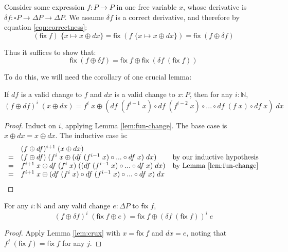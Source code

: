 \documentclass[a5,libertine]{rntz}
\newcommand{\ms}[1]{\ensuremath{\mathsf{#1}}}
\newcommand{\N}{\mathbb{N}}
\newcommand{\sub}[1]{\;\{{#1}\}}
\newcommand{\Disc}[1]{\square{#1}}
\newcommand{\fix}{\ms{fix}}
\newcommand{\dv}{\delta}
\begin{document}
Consider some expression $f : P \to P$ in one free variable $x$, whose
derivative is $\dv f : \Disc{P} \to \Delta P \to \Delta P$. We assume $\dv f$ is
a correct derivative, and therefore by equation \ref{eqn:correctness}:
\[
  (\fix\;f)\sub{x\mapsto x \oplus dx}
  = \fix\;(f\sub{x\mapsto x \oplus dx})
  = \fix\;(f \oplus \dv f)
\]

Thus it suffices to show that:
\[ \fix\;(f \oplus \dv f) = \fix\;f \oplus \fix\;(\dv f\; (\fix\;f)) \]

To do this, we will need the corollary of one crucial lemma:


\begin{lemma}
  \label{lem:crux} If $df$ is a valid change to $f$ and $dx$ is a valid change to $x : P$, then for any $i : \N$,
  \[
  (f\oplus df)^i \;(x \oplus dx)
  = f^i\;x \oplus
  (df\;(f^{i-1}\;x) \circ df\;(f^{i-2}\;x) \circ ...
  \circ df\;(f\;x) \circ df\;x)\; dx
  \]
\end{lemma}

\begin{proof}
  Induct on $i$, applying Lemma \ref{lem:fun-change}. The base case is $x \oplus
  dx = x \oplus dx$. The inductive case is:
  \[
  \begin{array}{cll}
     & (f \oplus df)^{i+1}\; (x \oplus dx)\\
    =& (f \oplus df)\; (f^i\;x \oplus
    (df \;(f^{i-1}\;x) \circ ... \circ df\;x)\;dx)
    & \text{by our inductive hypothesis}\\
    =& f^{i+1}\;x \oplus df\; (f^i\;x) \;
    ((df \;(f^{i-1}\;x) \circ ... \circ df\;x)\;dx)
    & \text{by Lemma \ref{lem:fun-change}}\\
    =& f^{i+1}\;x \oplus
    (df\;(f^i\;x) \circ df\;(f^{i-1}\;x) \circ ... \circ df\;x)\;dx
  \end{array}
  \]
\end{proof}

\begin{theorem}
  \label{thm:crux}
  For any $i : \N$ and any valid change $e : \Delta{P}$ to $\fix\;f$,
  \[
  (f\oplus\dv f)^i \;(\fix\;f \oplus e)
  = \fix\;f \oplus (\dv f \; (\fix\;f))^i \;e
  \]
\end{theorem}
\begin{proof}
  Apply Lemma \ref{lem:crux} with $x = \fix\;f$ and $dx = e$, noting that
  $f^j\;(\fix\;f) = \fix\;f$ for any $j$.
\end{proof}


\end{document}
